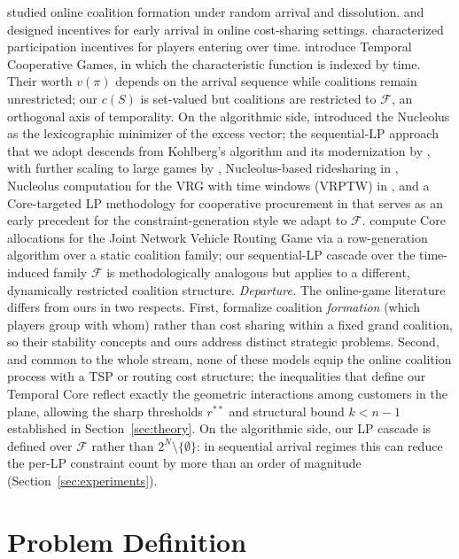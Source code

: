 \documentclass[11pt]{article}
\theoremstyle{plain}
\theoremstyle{definition}
\theoremstyle{remark}
\newcommand{\F}{\mathcal{F}}
\begin{document}
\citet{bullinger2023online} studied online coalition formation under random arrival and dissolution. \citet{ge2024incentives} and \citet{zhang2025incentives} designed incentives for early arrival in online cost-sharing settings. \citet{aziz2025participation} characterized participation incentives for players entering over time. \citet{goyal2025temporal} introduce Temporal Cooperative Games, in which the characteristic function is indexed by time. Their worth $v(\pi)$ depends on the arrival sequence while coalitions remain unrestricted; our $c(S)$ is set-valued but coalitions are restricted to $\mathcal{F}$, an orthogonal axis of temporality. On the algorithmic side, \citet{schmeidler1969nucleolus} introduced the Nucleolus as the lexicographic minimizer of the excess vector; the sequential-LP approach that we adopt descends from Kohlberg's algorithm and its modernization by \citet{guajardo2015nucleolus}, with further scaling to large games by \citet{nguyen2016large}, Nucleolus-based ridesharing in \citet{lu2019ridesharing}, Nucleolus computation for the VRG with time windows (VRPTW) in \citet{tae2020vrgtw}, and a Core-targeted LP methodology for cooperative procurement in \citet{drechsel2010computing} that serves as an early precedent for the constraint-generation style we adapt to $\F$. \citet{vanzon2021joint} compute Core allocations for the Joint Network Vehicle Routing Game via a row-generation algorithm over a static coalition family; our sequential-LP cascade over the time-induced family $\F$ is methodologically analogous but applies to a different, dynamically restricted coalition structure. \emph{Departure.} The online-game literature differs from ours in two respects. First, \citet{bullinger2023online} formalize coalition \emph{formation} (which players group with whom) rather than cost sharing within a fixed grand coalition, so their stability concepts and ours address distinct strategic problems. Second, and common to the whole stream, none of these models equip the online coalition process with a TSP or routing cost structure; the inequalities that define our Temporal Core reflect exactly the geometric interactions among customers in the plane, allowing the sharp thresholds $r^{\ast\ast}$ and structural bound $k<n-1$ established in Section~\ref{sec:theory}. On the algorithmic side, our LP cascade is defined over $\F$ rather than $2^N\setminus\{\emptyset\}$: in sequential arrival regimes this can reduce the per-LP constraint count by more than an order of magnitude (Section~\ref{sec:experiments}).

\section{Problem Definition}
\label{sec:problem}
\end{document}
